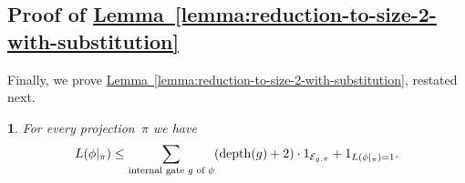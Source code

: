 \documentclass[11pt]{article}
\makeatletter
\numberwithin{equation}{section}
\theoremstyle{definition}
\theoremstyle{plain}
\newcommand{\expref}[2]{\hyperref[#2]{#1~\ref{#2}}}
\theoremstyle{definition}\newtheorem{notation}[theorem]{Notation}\theoremstyle{plain}
\newcommand{\dpt}{\mathrm{depth}}
\newcommand{\cE}{\mathcal{E}}
\theoremstyle{definition}
\theoremstyle{plain}
\newtheorem*{restated@theorem}{\rep@title}
\newenvironment{restated}[1]{%
	 \def\rep@title{#1}%
	 \begin{restated@theorem}}%
	{\end{restated@theorem}}
\makeatother
\begin{document}
\subsection{\label{subsec:reduction-to-size-2-with-substitution}Proof of \expref{Lemma}{lemma:reduction-to-size-2-with-substitution}}

Finally, we prove \expref{Lemma}{lemma:reduction-to-size-2-with-substitution},
restated next.
\begin{restated}{\expref{Lemma}{lemma:reduction-to-size-2-with-substitution}}
For every projection~$\pi$ we have 
\begin{equation}
L(\phi|_{\pi})\le\sum_{\text{internal gate \ensuremath{g} of \ensuremath{\phi}}}(\dpt(g)+2)\cdot1_{\cE_{g,\pi}}+1_{L(\phi|_{\pi})=1}.\label{eq:reduction-to-size-2-with-substitution}
\end{equation}
\end{restated}
\end{document}
